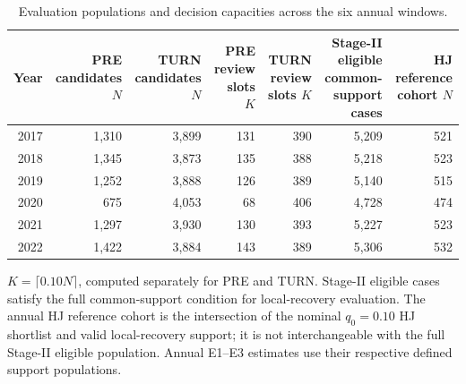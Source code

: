 \begin{table}[pos=t]
\centering
\caption{Evaluation populations and decision capacities across the six annual windows.}
\label{tab:results_scope}
\small
\begin{tabular}{rrrrrrr}
\toprule
Year & \shortstack{PRE candidates\\$N$} & \shortstack{TURN candidates\\$N$} &
\shortstack{PRE review\\slots $K$} & \shortstack{TURN review\\slots $K$} &
\shortstack{Stage-II eligible\\common-support cases} & \shortstack{HJ reference\\cohort $N$} \\
\midrule
2017 & 1,310 & 3,899 & 131 & 390 & 5,209 & 521 \\
2018 & 1,345 & 3,873 & 135 & 388 & 5,218 & 523 \\
2019 & 1,252 & 3,888 & 126 & 389 & 5,140 & 515 \\
2020 & 675 & 4,053 & 68 & 406 & 4,728 & 474 \\
2021 & 1,297 & 3,930 & 130 & 393 & 5,227 & 523 \\
2022 & 1,422 & 3,884 & 143 & 389 & 5,306 & 532 \\
\bottomrule
\end{tabular}
\par\vspace{3pt}
\begin{minipage}{0.98\linewidth}
\footnotesize
$K=\lceil 0.10N\rceil$, computed separately for PRE and TURN. Stage-II eligible cases satisfy the full common-support condition for local-recovery evaluation. The annual HJ reference cohort is the intersection of the nominal $q_0=0.10$ HJ shortlist and valid local-recovery support; it is not interchangeable with the full Stage-II eligible population. Annual E1--E3 estimates use their respective defined support populations.
\end{minipage}
\end{table}

